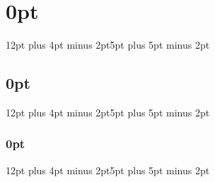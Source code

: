 \documentclass[a4paper,oneside,anyway]{book}%
\begin{document}
\pagestyle{empty}

\tableofcontents \newpage
\listoffigures \newpage
\listoftables \newpage
\pagestyle{fancy}
\DefaultMathsDigits

\usepackage{titlesec}
\titlespacing\section{0pt}{12pt plus 4pt minus 2pt}{5pt plus 5pt minus 2pt}
\titlespacing\subsection{0pt}{12pt plus 4pt minus 2pt}{5pt plus 5pt minus 2pt}
\titlespacing\subsubsection{0pt}{12pt plus 4pt minus 2pt}{5pt plus 5pt minus 2pt}










\begingroup
{}
\renewcommand{\baselinestretch}{1.1} 
\pagestyle{empty}
{


}
\endgroup



\end{document}

